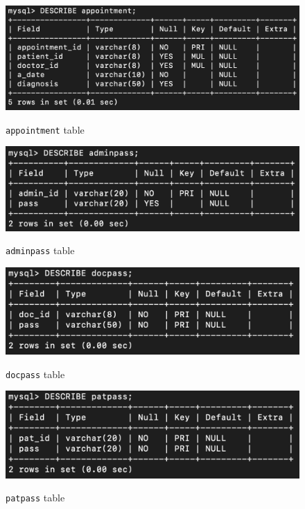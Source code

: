 \documentclass[12pt]{article}
\let\oldtexttt\texttt
\renewcommand{\texttt}[1]{
  \colorbox{bgcolor}{\oldtexttt{#1}}
  }
\begin{document}
\newpage

\begin{figure}[!hbt]
    \centering
    \includegraphics[scale=0.85]{tables/7.png}
    \label{fig:data}
    \caption{\texttt{appointment} table}
\end{figure}

\vspace{5mm}

\begin{figure}[!hbt]
    \centering
    \includegraphics[scale=0.85]{tables/8.png}
    \label{fig:my_label1}
    \caption{\texttt{adminpass} table}
\end{figure}

\newpage

\begin{figure}[!hbt]
    \centering
    \includegraphics[scale=0.85]{tables/9.png}
    \label{fig:data}
    \caption{\texttt{docpass} table}
\end{figure}

\begin{figure}[!hbt]
    \centering
    \includegraphics[scale=0.85]{tables/10.png}
    \label{fig:my_label1}
    \caption{\texttt{patpass} table}
\end{figure}
\end{document}

